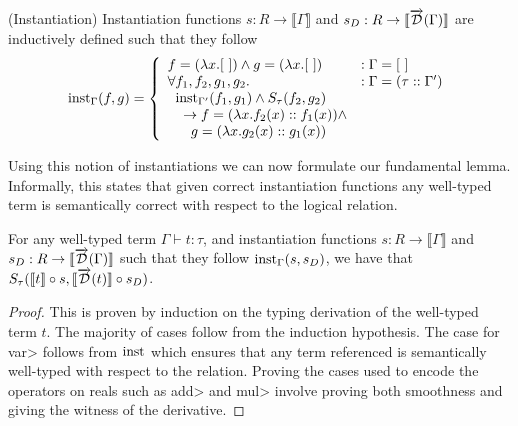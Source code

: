   \begin{definition}(Instantiation)
    Instantiation functions $s : R \rightarrow \llbracket \Gamma \rrbracket$ and $s_D : R \rightarrow \llbracket \overrightarrow{\mathcal{D}}(\Gamma) \rrbracket$ are inductively defined such that they follow
    \begin{equation}
      \text{inst}_{\Gamma}(f, g) =
        \left\{
          \begin{array}{ll}
            f = (\lambda x. [\ ]) \wedge g = (\lambda x. [\ ])
              & : \Gamma = [\ ] \\
            \forall f_1, f_2, g_1, g_2.
              & : \Gamma = (\tau :: \Gamma') \\
              \;\;\text{inst}_{\Gamma'}(f_1, g_1) \wedge S_\tau(f_2, g_2) \\
              \;\;\;\; \to f = (\lambda x. f_2(x) :: f_1(x)) \wedge \\
              \;\;\;\;\;\; g = (\lambda x. g_2(x) :: g_1(x))
          \end{array}
        \right.
    \label{eqn:inst_base}
    \end{equation}
  \end{definition}

  Using this notion of instantiations we can now formulate our fundamental lemma. Informally, this states that given correct instantiation functions any well-typed term is semantically correct with respect to the logical relation.

  \begin{lemma}\label{thm:fundamental_lemma}
    For any well-typed term $\Gamma \vdash t : \tau$, and instantiation functions $s : R \rightarrow \llbracket \Gamma \rrbracket$ and $s_D : R \rightarrow \llbracket \overrightarrow{\mathcal{D}}(\Gamma) \rrbracket$ such that they follow $\text{inst}_{\Gamma}(s, s_D)$, we have that $S_\tau(\llbracket t\rrbracket \circ s, \llbracket \overrightarrow{\mathcal{D}}(t)\rrbracket \circ s_D)$.
  \end{lemma}


  \begin{proof}
    This is proven by induction on the typing derivation of the well-typed term $t$. The majority of cases follow from the induction hypothesis.
    The case for \<var> follows from $\text{inst}_{}$ which ensures that any term referenced is semantically well-typed with respect to the relation.
    Proving the cases used to encode the operators on reals such as \<add> and \<mul> involve proving both smoothness and giving the witness of the derivative.
  \end{proof}


